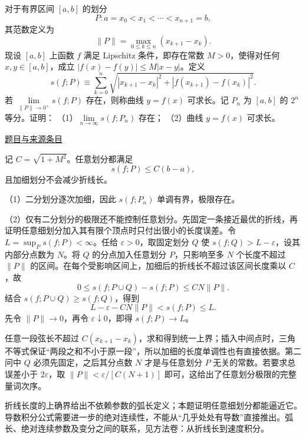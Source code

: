 \documentclass[12pt,fontset=fandol]{ctexart}
\begin{document}
\begin{example}[来源序号6]\label{ex:ch09-12th-A:6}\label{pr:ch09-12th-A:6}

对于有界区间 $[a,b]$ 的划分
\[
P:a=x_{0}<x_{1}<\cdots<x_{n+1}=b,
\]
其范数定义为
\[
\|P\|=\max_{0\leq k\leq n}\left(x_{k+1}-x_{k}\right).
\]
现设 $[a,b]$ 上函数 $f$ 满足 Lipschitz 条件，即存在常数 $M>0$，使得对任何 $x,y\in[a,b]$，成立 $|f(x)-f(y)|\leq M|x-y|$。定义
\[
s(f;P)\equiv\sum_{k=0}^{n}\sqrt{\left|x_{k+1}-x_{k}\right|^{2}+\left|f\left(x_{k+1}\right)-f\left(x_{k}\right)\right|^{2}}.
\]
若 $\lim\limits_{\|P\|\to 0^{+}}s(f;P)$ 存在，则称曲线 $y=f(x)$ 可求长。记 $P_{n}$ 为 $[a,b]$ 的 $2^{n}$ 等分。证明：
（1）$\lim\limits_{n\to\infty}s\left(f;P_{n}\right)$ 存在；
（2）曲线 $y=f(x)$ 可求长。

\par\href{https://github.com/lzxcr/cmc-mathematics/blob/64916fa1fdbc3e444a652eca204d5669058ee321/src/problems/preliminary/12/06.md}{题目与来源条目}

\end{example}

\begin{solve}\label{ans:ch09-12th-A:6}

记 $C=\sqrt{1+M^2}$。任意划分都满足
\[
s(f;P)\leq C(b-a),
\]
且加细划分不会减少折线长。

（1）二分划分逐次加细，因此 $s(f;P_n)$ 单调有界，极限存在。

（2）仅有二分划分的极限还不能控制任意划分。先固定一条接近最优的折线，再证明任意细划分加入其有限个顶点时只付出很小的长度误差。令 $L=\sup_P s(f;P)<\infty$。任给 $\varepsilon>0$，取固定划分 $Q$ 使 $s(f;Q)>L-\varepsilon$，设其内部分点数为 $N$。将 $Q$ 的分点加入任意划分 $P$，只影响至多 $N$ 个长度不超过 $\|P\|$ 的区间。在每个受影响区间上，加细后的折线长不超过该区间长度乘以 $C$，故
\[
0\leq s(f;P\cup Q)-s(f;P)\leq CN\|P\|.
\]
结合 $s(f;P\cup Q)\geq s(f;Q)$，得到
\[
L-\varepsilon-CN\|P\|<s(f;P)\leq L.
\]
先令 $\|P\|\to0$，再令 $\varepsilon\downarrow0$，即得 $s(f;P)\to L$。

任意一段弦长不超过 $C(x_{k+1}-x_k)$，求和得到统一上界；插入中间点时，三角不等式保证“两段之和不小于原一段”，所以加细的长度单调性也有直接依据。第二问中 $Q$ 必须先固定，之后其分点数 $N$ 才是与任意划分 $P$ 无关的常数。若要求总误差小于 $2\varepsilon$，取 $\|P\|<\varepsilon/[C(N+1)]$ 即可，这给出了任意划分极限的完整量词次序。

\end{solve}

\begin{remark}[方法与条件]折线长度的上确界给出不依赖参数的弧长定义；本题证明任意细划分都能逼近它。导数积分公式需要进一步的绝对连续性，不能从“几乎处处有导数”直接推出。弧长、绝对连续参数及变分之间的联系，见方法卷：从折线长到速度积分。\end{remark}
\end{document}
